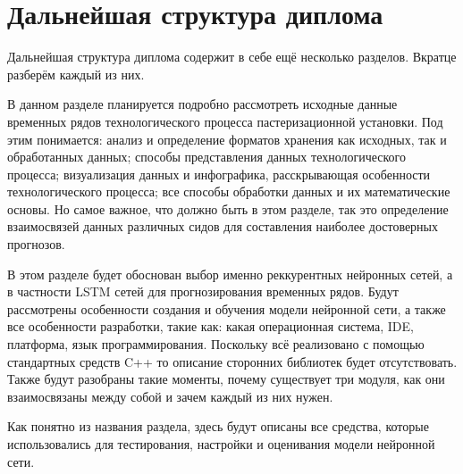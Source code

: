 \sectionbreak \section*{
  \gostTitleFont
  \redline
  Дальнейшая структура диплома
}

\subtitlespace

{\gostFont

  \par \redline Дальнейшая структура диплома содержит в себе ещё несколько разделов. Вкратце разберём каждый из них.

  \par {}

  \par \redline В данном разделе планируется подробно рассмотреть исходные данные временных рядов технологического процесса пастеризационной установки. Под этим понимается: анализ и определение форматов хранения как исходных, так и обработанных данных; способы представления данных технологического процесса; визуализация данных и инфографика, расскрывающая особенности технологического процесса; все способы обработки данных и их математические основы. Но самое важное, что должно быть в этом разделе, так это определение взаимосвязей данных различных сидов для составления наиболее достоверных прогнозов. 

  \par {}

  \par \redline В этом разделе будет обоснован выбор именно реккурентных нейронных сетей, а в частности LSTM сетей для прогнозирования временных рядов. Будут рассмотрены особенности создания и обучения модели нейронной сети, а также все особенности разработки, такие как: какая операционная система, IDE, платформа, язык программирования. Поскольку всё реализовано с помощью стандартных средств C++ то описание сторонних библиотек будет отсутствовать. Также будут разобраны такие моменты, почему существует три модуля, как они взаимосвязаны между собой и зачем каждый из них нужен. 

  \par {}

  \par \redline Как понятно из названия раздела, здесь будут описаны все средства, которые использовались для тестирования, настройки и оценивания модели нейронной сети.

}
